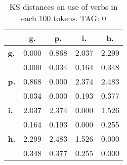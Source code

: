 \begin{table}[h!]
\begin{center}
\begin{tabular}{| l || c | c | c | c |}\hline
 & {\bf g.} & {\bf p.} & {\bf i.} & {\bf h.} \\\hline\hline
{\bf g.} & 0.000 & 0.868 & 2.037 & 2.299 \\
{\bf } & 0.000 & 0.034 & 0.164 & 0.348 \\\hline
{\bf p.} & 0.868 & 0.000 & 2.374 & 2.483 \\
{\bf } & 0.034 & 0.000 & 0.193 & 0.377 \\\hline
{\bf i.} & 2.037 & 2.374 & 0.000 & 1.526 \\
{\bf } & 0.164 & 0.193 & 0.000 & 0.255 \\\hline
{\bf h.} & 2.299 & 2.483 & 1.526 & 0.000 \\
{\bf } & 0.348 & 0.377 & 0.255 & 0.000 \\\hline
\end{tabular}
\caption{KS distances on use of verbs in each 100 tokens. TAG: 0}
\end{center}
\end{table}
